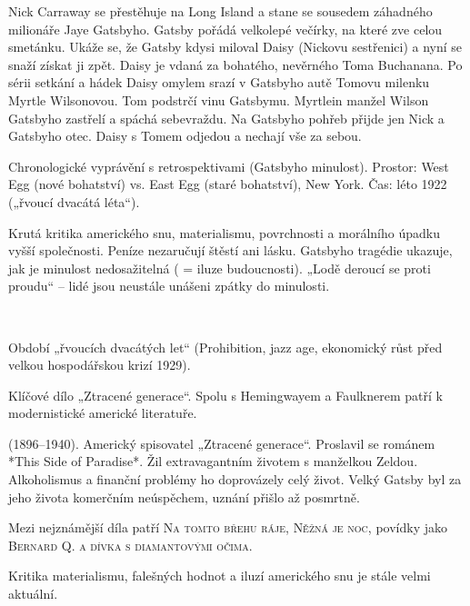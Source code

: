 \documentclass[FGBook.tex]{subfiles}
\begin{document}
\noindent Nick Carraway se přestěhuje na Long Island a stane se sousedem záhadného milionáře Jaye Gatsbyho. Gatsby pořádá velkolepé večírky, na které zve celou smetánku. Ukáže se, že Gatsby kdysi miloval Daisy (Nickovu sestřenici) a nyní se snaží získat ji zpět. Daisy je vdaná za bohatého, nevěrného Toma Buchanana. Po sérii setkání a hádek Daisy omylem srazí v Gatsbyho autě Tomovu milenku Myrtle Wilsonovou. Tom podstrčí vinu Gatsbymu. Myrtlein manžel Wilson Gatsbyho zastřelí a spáchá sebevraždu. Na Gatsbyho pohřeb přijde jen Nick a Gatsbyho otec. Daisy s Tomem odjedou a nechají vše za sebou.

\noindent Chronologické vyprávění s retrospektivami (Gatsbyho minulost). Prostor: West Egg (nové bohatství) vs. East Egg (staré bohatství), New York. Čas: léto 1922 („řvoucí dvacátá léta“).

\noindent Krutá kritika amerického snu, materialismu, povrchnosti a morálního úpadku vyšší společnosti. Peníze nezaručují štěstí ani lásku. Gatsbyho tragédie ukazuje, jak je minulost nedosažitelná ( = iluze budoucnosti). „Lodě deroucí se proti proudu“ – lidé jsou neustále unášeni zpátky do minulosti.

\vspace*{2em}\\

\noindent Období „řvoucích dvacátých let“ (Prohibition, jazz age, ekonomický růst před velkou hospodářskou krizí 1929).

\noindent Klíčové dílo „Ztracené generace“. Spolu s Hemingwayem a Faulknerem patří k modernistické americké literatuře.

\noindent (1896–1940). Americký spisovatel „Ztracené generace“. Proslavil se románem *This Side of Paradise*. Žil extravagantním životem s manželkou Zeldou. Alkoholismus a finanční problémy ho doprovázely celý život. Velký Gatsby byl za jeho života komerčním neúspěchem, uznání přišlo až posmrtně.

\noindent Mezi nejznámější díla patří \textsc{Na tomto břehu ráje}, \textsc{Něžná je noc}, povídky jako \textsc{Bernard Q. a dívka s diamantovými očima}.

\noindent Kritika materialismu, falešných hodnot a iluzí amerického snu je stále velmi aktuální.
\end{document}
